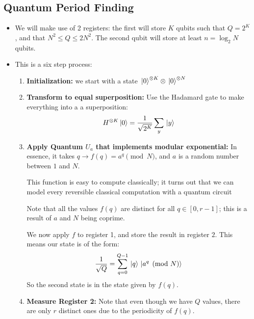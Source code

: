 \subsection{Quantum Period Finding}
\begin{itemize}
	\item We will make use of 2 registers: the first will store \( K \) qubits such that \( Q = 2^{K} \), and 
		that \( N^2 \le  Q \le  2N^2 \). The second qubit will store at least \( n = \log_2 N \) qubits.
	\item This is a six step process:
		\begin{enumerate}[label=\arabic*.]
			\item \textbf{Initialization:} we start with a state \( \ket*{0}^{\otimes K} \otimes \ket*{0}^{\otimes N} \) 
			\item \textbf{Transform to equal superposition:} Use the Hadamard gate to make everything into a
				a superposition: 
				\[
				H^{\otimes K}\ket*{0} = \frac{1}{\sqrt{2^{K}} }\sum_y  \ket*{y}  
				\] 
			\item \textbf{Apply Quantum \( U_a \) that implements modular exponential:} In essence, it takes 
				\( q \to f(q) = a^{q} \pmod N \), and \( a \) is a random number between \( 1 \) and \( N \). 

				This function is easy to compute classically; it turns out that we can model every reversible 
				classical computation with a quantum circuit  

				Note that all the values \( f(q) \) are distinct for all \( q \in [0, r - 1] \); this is a result 
				of \(a \) and \( N \) being coprime. 
				
				We now apply \( f \) to register 1, and store the result in register \( 2 \).
				This means our state is of the form: 
				\[
				\frac{1}{\sqrt{Q} } = \sum_{q = 0}^{Q - 1}\ket*{q} \ket*{a^{q} \pmod N}
				\] 
				So the second state is in the state given by \( f(q) \). 
			\item \textbf{Measure Register 2:} Note that even though we have \( Q \) values, there are only 
				\( r \) distinct ones due to the periodicity of \( f(q) \). 


\end{enumerate}
\end{itemize}
